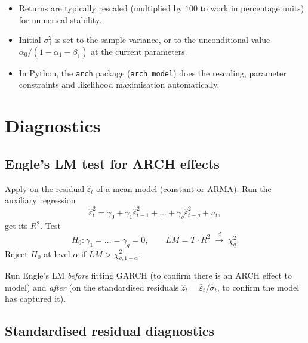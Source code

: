 \begin{rembox}
\begin{itemize}
  \item Returns are typically rescaled (multiplied by $100$ to work
        in percentage units) for numerical stability.
  \item Initial $\sigma_1^2$ is set to the sample variance, or to
        the unconditional value $\alpha_0 / (1 - \alpha_1 -
        \beta_1)$ at the current parameters.
  \item In Python, the \texttt{arch} package
        (\texttt{arch\_model}) does the rescaling, parameter
        constraints and likelihood maximisation automatically.
\end{itemize}
\end{rembox}

\section{Diagnostics}
\label{sec:garch-diag}

\subsection{Engle's LM test for ARCH effects}

\begin{defbox}
\label{def:engle-lm}
Apply on the residual $\widehat\varepsilon_t$ of a mean model
(constant or ARMA). Run the auxiliary regression
\[
  \widehat\varepsilon_t^2
  = \gamma_0 + \gamma_1 \widehat\varepsilon_{t-1}^2
            + \dots + \gamma_q \widehat\varepsilon_{t-q}^2 + u_t,
\]
get its $R^2$. Test
\[
  H_0: \gamma_1 = \dots = \gamma_q = 0,
  \qquad
  LM = T \cdot R^2 \;\xrightarrow{d}\; \chi^2_q.
\]
Reject $H_0$ at level $\alpha$ if $LM > \chi^2_{q, 1 - \alpha}$.
\end{defbox}

\begin{rembox}
Run Engle's LM \emph{before} fitting GARCH (to confirm there is an
ARCH effect to model) and \emph{after} (on the standardised
residuals $\widehat z_t = \widehat\varepsilon_t / \widehat\sigma_t$,
to confirm the model has captured it).
\end{rembox}

\subsection{Standardised residual diagnostics}

